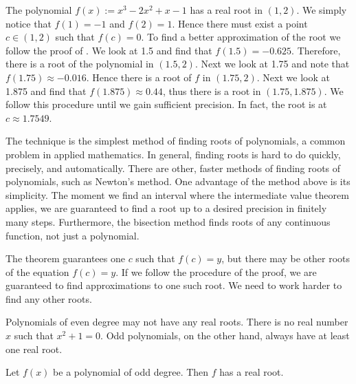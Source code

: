 \begin{example} %
The polynomial $f(x) := x^3-2x^2+x-1$ has a real root in $(1,2)$.  We simply
notice that $f(1) = -1$ and $f(2) = 1$.  Hence there must exist a point $c
\in (1,2)$ such that $f(c) = 0$.  To find a better approximation of
the root we follow the proof of .  
We look at 1.5 and find that $f(1.5) = -0.625$.  Therefore,
there is a root of the polynomial in $(1.5,2)$.  Next we look at 1.75
and note that $f(1.75) \approx -0.016$.  Hence there is a root of $f$ in
$(1.75,2)$.  Next we look at 1.875 and find that $f(1.875) \approx 0.44$,
thus there is a root in $(1.75,1.875)$.  We follow this procedure until we gain
sufficient precision.  In fact, the root is at $c \approx 1.7549$.
\end{example}

The technique is the simplest method of finding roots of polynomials,
a common problem in applied mathematics.
In general, finding roots is hard to do quickly, precisely,
and automatically.
There are other, faster methods of finding roots of polynomials, such
as Newton's method.  One advantage of the method above is its
simplicity.  The
moment we find an interval where the intermediate value theorem
applies, we are guaranteed to find a root up to a desired
precision in finitely many steps.  Furthermore, the bisection
method finds roots of any
continuous function, not just a polynomial.

The theorem guarantees one $c$ such that $f(c) = y$, but there
may be other roots of the equation $f(c) = y$.  If we follow
the procedure of the proof, we are guaranteed to find approximations to
one such root.  We need to work harder to find any other roots.

\medskip

Polynomials of even degree may not have any real roots.
There is no real number $x$ such that $x^2+1 = 0$.  Odd polynomials, on the
other hand, always have at least one real root.

\begin{prop}
Let $f(x)$ be a polynomial of odd degree.  Then $f$ has a real root.
\end{prop}

